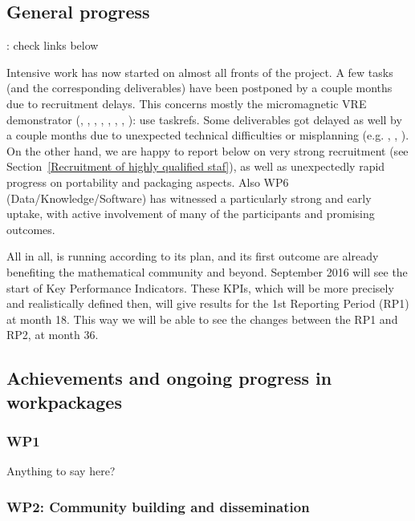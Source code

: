 \documentclass{deliverablereport}
\newcommand{\TODO}[1]{{\color{red}{TODO}: #1}}
\begin{document}
\subsection{General progress}

\TODO{check links below}

Intensive work has now started on almost all fronts of the project. A
few tasks (and the corresponding deliverables) have been postponed by
a couple months due to recruitment delays. This concerns mostly the
micromagnetic VRE demonstrator (, , , , , , , )\TODO{use taskrefs}. Some deliverables got delayed as well
by a couple months due to unexpected technical difficulties or
misplanning (e.g. ,
, ). On
the other hand, we are happy to report below on very strong
recruitment (see Section~\ref{Recruitment of highly qualified staf}), as well as unexpectedly rapid
progress on portability and packaging aspects. Also WP6
(Data/Knowledge/Software) has witnessed a particularly strong and
early uptake, with active involvement of many of the participants and
promising outcomes.

All in all, \ODK is running according to its plan, and its first
outcome are already benefiting the mathematical community and beyond. September 2016 will see the start of Key Performance Indicators. These KPIs, which will be more precisely and realistically defined then, will give results for the 1st Reporting Period (RP1) at month 18. This way we will be able to see the changes between the RP1 and RP2, at month 36.


\subsection{Achievements and ongoing progress in workpackages}

\subsubsection{WP1}

Anything to say here?

\subsubsection{WP2: Community building and dissemination}
\end{document}
